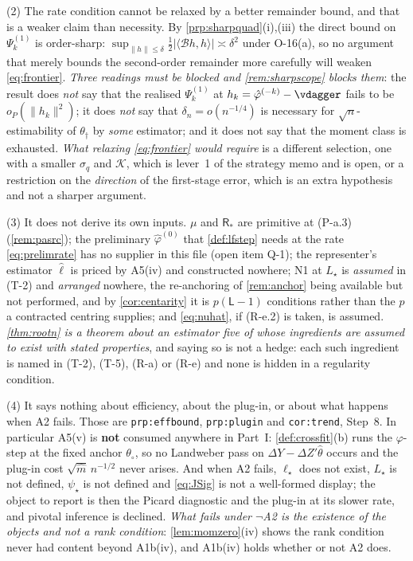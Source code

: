 \begin{remark}
(2) The rate condition cannot be relaxed by a better remainder bound, and that is a weaker claim
than necessity. By \cref{prp:sharpquad}\textup{(i)},\textup{(iii)} the direct bound on
$\Psi^{(1)}_k$ is order-sharp: $\sup_{\|h\|\le\delta}\tfrac12|\langle\mathcal Bh,h\rangle|\asymp\delta^{2}$
under O-16(a), so no argument that merely bounds the second-order remainder more carefully will weaken
\eqref{eq:frontier}. \emph{Three readings must be blocked and \cref{rem:sharpscope} blocks them}: the result
does \emph{not} say that the realised $\Psi^{(1)}_k$ at $h_k=\hat\varphi^{(-k)}-\vdagger$ fails to be
$o_P(\|h_k\|^{2})$; it does \emph{not} say that $\delta_n=o(n^{-1/4})$ is necessary for
$\sqrt n$-estimability of $\theta_\dagger$ by \emph{some} estimator; and it does not say that the moment class
is exhausted. \emph{What relaxing \eqref{eq:frontier} would require} is a different selection, one with a
smaller $\sigma_q$ and $\mathcal K$, which is lever~1 of the strategy memo and is open, or a restriction on
the \emph{direction} of the first-stage error, which is an extra hypothesis and not a sharper argument.

(3) It does not derive its own inputs. $\mu$ and $\mathsf R_\ast$ are primitive at (P-a.3)
(\cref{rem:pasrc}); the preliminary $\hat\varphi^{(0)}$ that \cref{def:lfstep} needs at the rate
\eqref{eq:prelimrate} has no supplier in this file (open item Q-1); the representer's estimator $\hat\ell$ is
priced by A5(iv) and constructed nowhere; N1 at $L_\star$ is \emph{assumed} in (T-2) and
\emph{arranged} nowhere, the re-anchoring of \cref{rem:anchor} being available but not performed, and by
\cref{cor:centarity} it is $p(\mathsf L-1)$ conditions rather than the $p$ a contracted centring
supplies; and \eqref{eq:nuhat}, if (R-e.2) is taken, is
assumed. \emph{\cref{thm:rootn} is a theorem about an estimator five of whose ingredients are assumed to
exist with stated properties}, and saying so is not a hedge: each such ingredient is named in (T-2), (T-5), (R-a) or
(R-e) and none is hidden in a regularity condition.

(4) It says nothing about efficiency, about the plug-in, or about what happens when A2 fails.
Those are \texttt{prp:effbound}, \texttt{prp:plugin} and \texttt{cor:trend}, Step~8. In particular
A5(v) is \textbf{not} consumed anywhere in Part~I: \cref{def:crossfit}(b) runs the
$\varphi$-step at the fixed anchor $\theta_\circ$, so no Landweber pass on
$\Delta Y-\Delta Z'\hat\theta$ occurs and the plug-in cost $\sqrt{\hat m}\,n^{-1/2}$ never arises. And when
A2 fails, $\ell_\star$ does not exist, $L_\star$ is not defined, $\psi_\star$ is not defined and
\eqref{eq:JSig} is not a well-formed display; the object to report is then the Picard diagnostic and the
plug-in at its slower rate, and pivotal inference is declined. \emph{What fails under $\neg$A2 is the
\emph{existence} of the objects and not a rank condition}:
\cref{lem:momzero}\textup{(iv)} shows the rank condition never had content beyond A1b(iv), and A1b(iv)
holds whether or not A2 does.


\end{remark}
